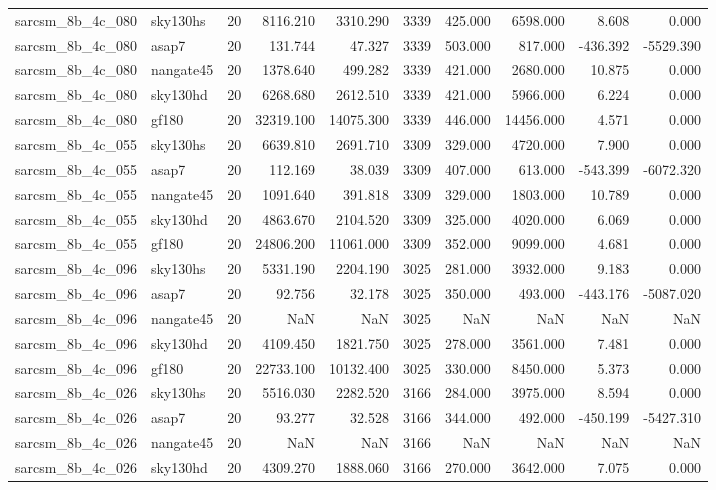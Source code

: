\documentclass{article}
\begin{document}
\begin{longtable}{llrrrrrrrr}
sarcsm\_8b\_4c\_080 & sky130hs & 20 & 8116.210 & 3310.290 & 3339 & 425.000 & 6598.000 & 8.608 & 0.000 \\
sarcsm\_8b\_4c\_080 & asap7 & 20 & 131.744 & 47.327 & 3339 & 503.000 & 817.000 & -436.392 & -5529.390 \\
sarcsm\_8b\_4c\_080 & nangate45 & 20 & 1378.640 & 499.282 & 3339 & 421.000 & 2680.000 & 10.875 & 0.000 \\
sarcsm\_8b\_4c\_080 & sky130hd & 20 & 6268.680 & 2612.510 & 3339 & 421.000 & 5966.000 & 6.224 & 0.000 \\
sarcsm\_8b\_4c\_080 & gf180 & 20 & 32319.100 & 14075.300 & 3339 & 446.000 & 14456.000 & 4.571 & 0.000 \\
sarcsm\_8b\_4c\_055 & sky130hs & 20 & 6639.810 & 2691.710 & 3309 & 329.000 & 4720.000 & 7.900 & 0.000 \\
sarcsm\_8b\_4c\_055 & asap7 & 20 & 112.169 & 38.039 & 3309 & 407.000 & 613.000 & -543.399 & -6072.320 \\
sarcsm\_8b\_4c\_055 & nangate45 & 20 & 1091.640 & 391.818 & 3309 & 329.000 & 1803.000 & 10.789 & 0.000 \\
sarcsm\_8b\_4c\_055 & sky130hd & 20 & 4863.670 & 2104.520 & 3309 & 325.000 & 4020.000 & 6.069 & 0.000 \\
sarcsm\_8b\_4c\_055 & gf180 & 20 & 24806.200 & 11061.000 & 3309 & 352.000 & 9099.000 & 4.681 & 0.000 \\
sarcsm\_8b\_4c\_096 & sky130hs & 20 & 5331.190 & 2204.190 & 3025 & 281.000 & 3932.000 & 9.183 & 0.000 \\
sarcsm\_8b\_4c\_096 & asap7 & 20 & 92.756 & 32.178 & 3025 & 350.000 & 493.000 & -443.176 & -5087.020 \\
sarcsm\_8b\_4c\_096 & nangate45 & 20 & NaN & NaN & 3025 & NaN & NaN & NaN & NaN \\
sarcsm\_8b\_4c\_096 & sky130hd & 20 & 4109.450 & 1821.750 & 3025 & 278.000 & 3561.000 & 7.481 & 0.000 \\
sarcsm\_8b\_4c\_096 & gf180 & 20 & 22733.100 & 10132.400 & 3025 & 330.000 & 8450.000 & 5.373 & 0.000 \\
sarcsm\_8b\_4c\_026 & sky130hs & 20 & 5516.030 & 2282.520 & 3166 & 284.000 & 3975.000 & 8.594 & 0.000 \\
sarcsm\_8b\_4c\_026 & asap7 & 20 & 93.277 & 32.528 & 3166 & 344.000 & 492.000 & -450.199 & -5427.310 \\
sarcsm\_8b\_4c\_026 & nangate45 & 20 & NaN & NaN & 3166 & NaN & NaN & NaN & NaN \\
sarcsm\_8b\_4c\_026 & sky130hd & 20 & 4309.270 & 1888.060 & 3166 & 270.000 & 3642.000 & 7.075 & 0.000 \\

\end{longtable}
\end{document}
